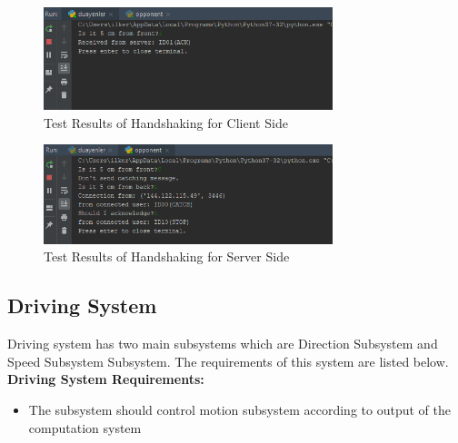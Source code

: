 \documentclass[a4paper,12pt]{article}
\begin{document}
	\begin{figure}[H]
		\center
		\setlength{\unitlength}{\textwidth} 				\includegraphics[width=0.75\textwidth]{images/handshake1}
		\caption{\label{fig:handshake1}Test Results of Handshaking for Client Side}
	\end{figure}
	
	\begin{figure}[H]
		\center
		\setlength{\unitlength}{\textwidth} 
		\includegraphics[width=0.75\textwidth]{images/handshake2}
		\caption{\label{fig:handshake2}Test Results of Handshaking for Server Side}
	\end{figure}	
	
	\subsection{Driving System}
	
	Driving system has two main subsystems which are Direction Subsystem and Speed Subsystem Subsystem. The requirements of this system are listed below.\\
	
	\textbf{Driving System Requirements:}
	\begin{itemize}
		\item The subsystem should control motion subsystem according to output of the computation system
	\end{itemize}
	
	
\end{document}
